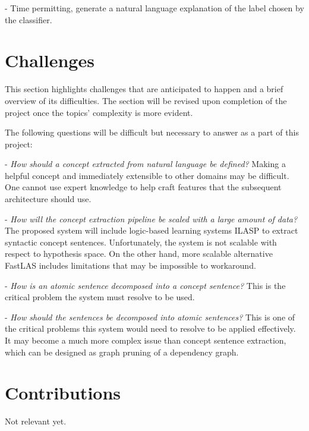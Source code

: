  - Time permitting, generate a natural language explanation of the label chosen by the classifier. 


\section{Challenges}

This section highlights challenges that are anticipated to happen and a brief overview of its difficulties.
The section will be revised upon completion of the project once the topics' complexity is more evident.

The following questions will be difficult but necessary to answer as a part of this project:

 - \emph{How should a concept extracted from natural language be defined?} Making a helpful concept and immediately extensible to other domains may be difficult. One cannot use expert knowledge to help craft features that the subsequent architecture should use.
 
 
 - \emph{How will the concept extraction pipeline be scaled with a large amount of data?} The proposed system will include logic-based learning systems ILASP \cite{RefWorks:RefID:18-law2020ilasp} to extract syntactic concept sentences. 
 Unfortunately, the system is not scalable with respect to hypothesis space. On the other hand, more scalable alternative FastLAS \cite{RefWorks:RefID:19-law2020fastlas:} includes limitations that may be impossible to workaround.
 
 - \emph{How is an atomic sentence decomposed into a concept sentence?} This is the critical problem the system must resolve to be used.

 - \emph{How should the sentences be decomposed into atomic sentences?} This is one of the critical problems this system would need to resolve to be applied effectively. It may become a much more complex issue than concept sentence extraction, which can be designed as graph pruning of a dependency graph.
 


\section{Contributions}

Not relevant yet.


